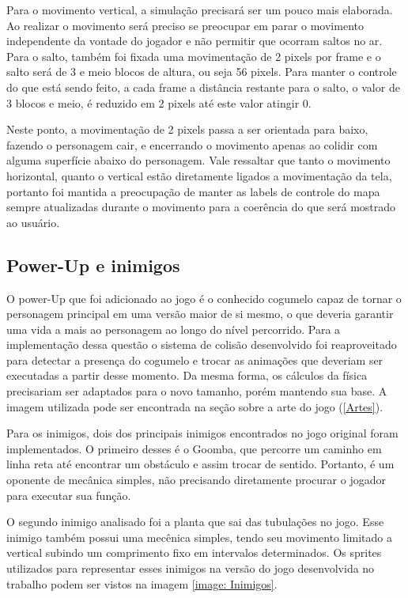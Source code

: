 \documentclass[11pt, twocolumn]{extarticle}
\begin{document}
Para o movimento vertical, a simulação precisará ser um pouco mais elaborada. Ao realizar o movimento será preciso se preocupar em parar o movimento independente da vontade do jogador e não permitir que ocorram saltos no ar. Para o salto, também foi fixada uma movimentação de 2 pixels por frame e o salto será de 3 e meio blocos de altura, ou seja 56 pixels. Para manter o controle do que está sendo feito, a cada frame a distância restante para o salto, o valor de 3 blocos e meio, é reduzido em 2 pixels até este valor atingir 0.

Neste ponto, a movimentação de 2 pixels passa a ser orientada para baixo, fazendo o personagem cair, e encerrando o movimento apenas ao colidir com alguma superfície abaixo do personagem. Vale ressaltar que tanto o movimento horizontal, quanto o vertical estão diretamente ligados a movimentação da tela, portanto foi mantida a preocupação de manter as labels de controle do mapa sempre atualizadas durante o movimento para a coerência do que será mostrado ao usuário.


\subsection{Power-Up e inimigos}
\indent \indent O power-Up que foi adicionado ao jogo é o conhecido cogumelo capaz de tornar o personagem principal em uma versão maior de si mesmo, o que deveria garantir uma vida a mais ao personagem ao longo do nível percorrido. Para a implementação dessa questão o sistema de colisão desenvolvido foi reaproveitado para detectar a presença do cogumelo e trocar as animações que deveriam ser executadas a partir desse momento. Da mesma forma, os cálculos da física precisariam ser adaptados para o novo tamanho, porém mantendo sua base. A imagem utilizada pode ser encontrada na seção sobre a arte do jogo (\ref{Artes}).

Para os inimigos, dois dos principais inimigos encontrados no jogo original foram implementados. O primeiro desses é o Goomba, que percorre um caminho em linha reta até encontrar um obstáculo e assim trocar de sentido. Portanto, é um oponente de mecânica simples, não precisando diretamente procurar o jogador para executar sua função.

O segundo inimigo analisado foi a planta que sai das tubulações no jogo. Esse inimigo também possui uma mecênica simples, tendo seu movimento limitado a vertical subindo um comprimento fixo em intervalos determinados. Os sprites utilizados para representar esses inimigos na versão do jogo desenvolvida no trabalho podem ser vistos na imagem \ref{image: Inimigos}.
\end{document}
